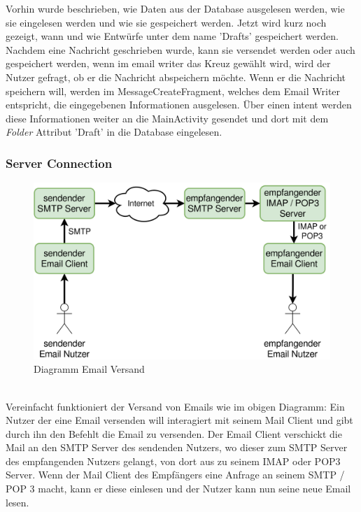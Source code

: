 \documentclass[a4paper,11pt]{article}
\begin{document}

\nohyphenation

Vorhin wurde beschrieben, wie Daten aus der Database ausgelesen werden, wie sie eingelesen werden und wie sie gespeichert werden. Jetzt wird kurz 
noch gezeigt, wann und wie Entwürfe unter dem name 'Drafts' gespeichert werden. \\

Nachdem eine Nachricht geschrieben wurde, kann sie versendet werden oder auch gespeichert werden, wenn im \gls{email writer} das Kreuz gewählt wird, wird der Nutzer 
gefragt, ob er die Nachricht abspeichern möchte. Wenn er die Nachricht speichern will, werden im MessageCreateFragment, welches dem Email Writer entspricht, die
eingegebenen Informationen ausgelesen. Über einen \gls{intent} werden diese Informationen weiter an die MainActivity gesendet und dort 
mit dem \textit{Folder} Attribut 'Draft' in die Database eingelesen.\\

\endgroup

\subsubsection{Server Connection}

\begin{figure}[H]
\center
\includegraphics[width=.7\textwidth]{media/connection-diagram.png}
\caption{Diagramm Email Versand}
\end{figure}

\phantom{.} \\ %
Vereinfacht funktioniert der Versand von Emails wie im obigen Diagramm: Ein Nutzer der eine Email versenden will interagiert mit seinem Mail Client und gibt durch ihn den Befehlt die Email zu versenden. Der Email Client verschickt die Mail an den SMTP Server des sendenden Nutzers, wo dieser zum SMTP Server des empfangenden Nutzers gelangt, von dort aus zu seinem IMAP oder POP3 Server. Wenn der Mail Client des Empfängers eine Anfrage an seinem SMTP / POP 3 macht, kann er diese einlesen und der Nutzer kann nun seine neue Email lesen.\\
\end{document}
